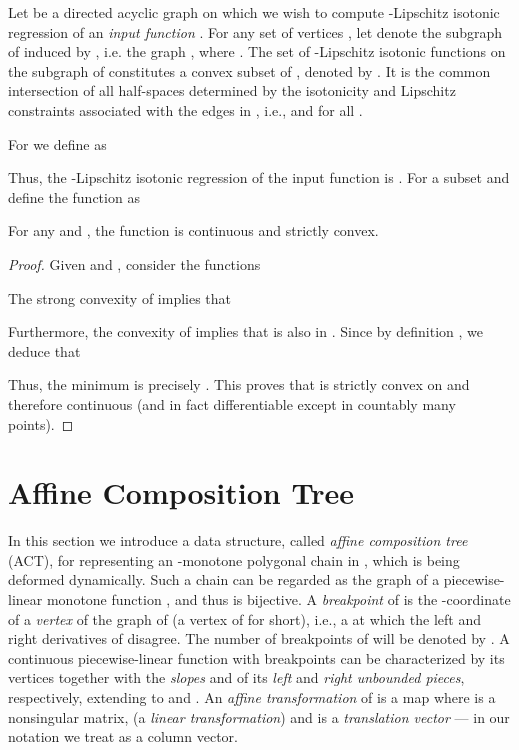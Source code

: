\documentclass[11pt]{article}
\begin{document}
Let  be a directed acyclic graph on which we wish to compute -Lipschitz isotonic regression of an {\em input function} . For any set of vertices , let  denote the subgraph of  induced by , i.e. the graph , where .  The set of -Lipschitz isotonic functions on the subgraph  of  constitutes
a convex subset of , denoted by .  It is the common intersection of all half-spaces determined by the isotonicity and Lipschitz constraints associated 
with the edges in , i.e.,  and  
for all .  

For  we define  as 

Thus, the -Lipschitz isotonic regression of the input function  is .  For a subset  and  define the function  as 



\begin{lemma}\label{lem:convex-general}
For any  and , the function  is continuous and strictly convex. 
\end{lemma}
\begin{proof}Given  and , consider the functions 

The strong convexity of  implies that 

Furthermore, the convexity of  implies that  is also in .  Since by definition , we deduce that 

Thus, the minimum is precisely . 
This proves that  is strictly convex on  and therefore continuous (and in fact differentiable except in countably many points).
\end{proof}



\section{Affine Composition Tree}\label{sec:datastructure}

In this section we introduce a data structure, called \emph{affine 
composition tree} (ACT), for representing an 
-monotone polygonal chain in , which is being deformed 
dynamically. Such a chain can be regarded as the graph of a 
piecewise-linear monotone function , and thus is bijective. 
A {\em breakpoint} of  is the -coordinate of a {\em vertex} of 
the graph of  (a vertex of  for short), i.e., a 
 at which the left and right derivatives of  disagree. The number of breakpoints of  will be denoted by . 
 A continuous piecewise-linear function  with breakpoints 
 can be characterized by its vertices 
 together with the {\em slopes}
 and  of its {\em left} and {\em right unbounded pieces},
respectively, extending to  and . 
An {\em affine transformation} of  is a map 
 where  is a nonsingular  matrix, 
(a {\em linear transformation\/}) and  is a 
{\em translation vector} --- in our notation we treat 
 as a column vector.
\end{document}
